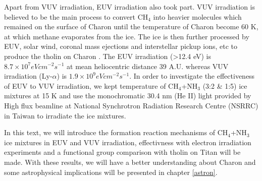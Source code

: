 Apart from VUV irradiation, EUV irradiation also took part. VUV irradiation is believed to be the main process to convert CH$_4$ into heavier molecules which remained on the surface of Charon until the temperature of Charon become 60 K, at which methane evaporates from the ice. The ice is then further processed by EUV, solar wind, coronal mass ejections and interstellar pickup ions, etc to produce the tholin on Charon \cite{grundy2016formation}. The EUV irradiation (>12.4 eV) is $8.7 \times 10^7 eV cm^{-2} s^{-1}$ at mean heliocentric distance 39 A.U. whereas VUV irradiation (Ly-$\alpha$) is $1.9 \times 10^9 eV cm^{-2} s^{-1}$. In order to investigate the effectiveness of EUV to VUV irradiation, we kept temperature of CH$_4$+NH$_3$ (3:2 \& 1:5) ice mixtures at 15 K and use the monochromatic 30.4 nm (He II) light provided by High flux beamline at National Synchrotron Radiation Research Centre (NSRRC) in Taiwan to irradiate the ice mixtures.

In this text, we will introduce the formation reaction mechanisms of CH$_4$+NH$_3$ ice mixtures in EUV and VUV irradiation, effectivness with electron irradiation experiments and a functional group comparison with tholin on Titan will be made. With these results, we will have a better understanding about Charon and some astrophysical implications will be presented in chapter \ref{astron}.

